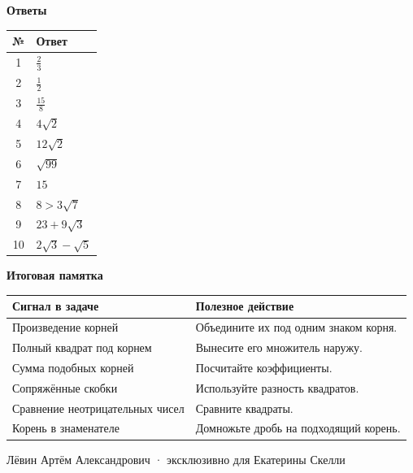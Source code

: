 \documentclass[a4paper,12pt]{article}
\begin{document}
\clearpage
\begin{center}{\Large\bfseries\textcolor{accentdark}{Ответы}}\end{center}
\vspace{.4cm}
\begin{table}[h]
\centering
\renewcommand{\arraystretch}{1.5}
\begin{tabularx}{.85\linewidth}{@{}cX@{}}
\toprule
\textbf{№} & \textbf{Ответ}\\
\midrule
1 & \(\frac23\)\\
2 & \(\frac12\)\\
3 & \(\frac{15}{8}\)\\
4 & \(4\sqrt2\)\\
5 & \(12\sqrt2\)\\
6 & \(\sqrt{99}\)\\
7 & \(15\)\\
8 & \(8>3\sqrt7\)\\
9 & \(23+9\sqrt3\)\\
10 & \(2\sqrt3-\sqrt5\)\\
\bottomrule
\end{tabularx}
\end{table}
\vspace{.9cm}
\noindent\textcolor{accentdark}{\textbf{Итоговая памятка}}\par
\begin{tabularx}{\linewidth}{@{}>{\raggedright\arraybackslash}p{.39\linewidth}X@{}}
\toprule
\textbf{Сигнал в задаче} & \textbf{Полезное действие}\\
\midrule
Произведение корней & Объедините их под одним знаком корня.\\
Полный квадрат под корнем & Вынесите его множитель наружу.\\
Сумма подобных корней & Посчитайте коэффициенты.\\
Сопряжённые скобки & Используйте разность квадратов.\\
Сравнение неотрицательных чисел & Сравните квадраты.\\
Корень в знаменателе & Домножьте дробь на подходящий корень.\\
\bottomrule
\end{tabularx}
\vfill
\begin{center}\footnotesize\textcolor{muted}{Лёвин Артём Александрович · эксклюзивно для Екатерины Скелли}\end{center}
\end{document}
